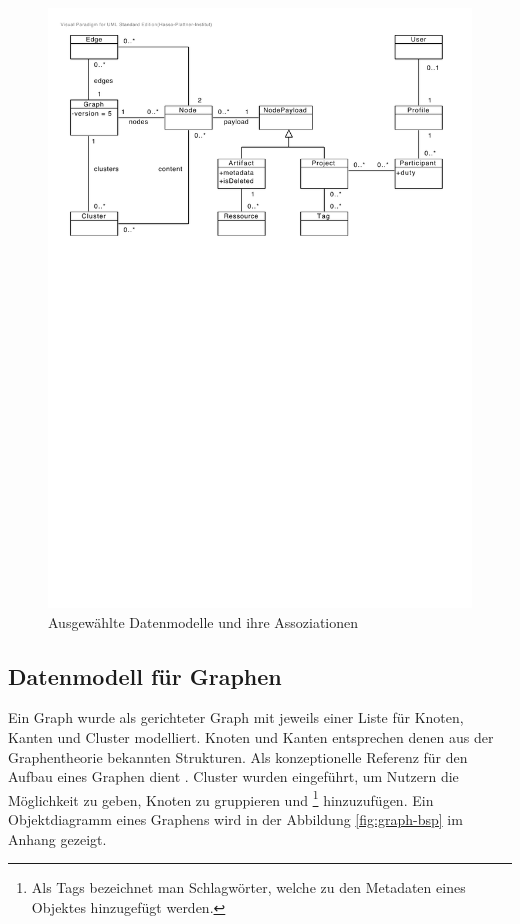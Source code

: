 \begin{figure}[h]  
  \centering     
  \includegraphics[width=1.0\textwidth]{img/models.pdf}  
   \caption{Ausgewählte Datenmodelle und ihre Assoziationen}
  \label{fig:models} 
\end{figure}

\subsection{Datenmodell für Graphen}
Ein Graph wurde als gerichteter Graph mit jeweils einer Liste für Knoten, Kanten und Cluster modelliert. Knoten und Kanten entsprechen denen aus der Graphentheorie bekannten Strukturen. Als konzeptionelle Referenz für den Aufbau eines Graphen dient \cite[p.~531]{corman}. Cluster wurden eingeführt, um Nutzern die Möglichkeit zu geben, Knoten zu gruppieren und \footnote{Als Tags bezeichnet man Schlagwörter, welche zu den Metadaten eines Objektes hinzugefügt werden.} hinzuzufügen. Ein Objektdiagramm eines Graphens wird in der Abbildung \ref{fig:graph-bsp} im Anhang gezeigt.

